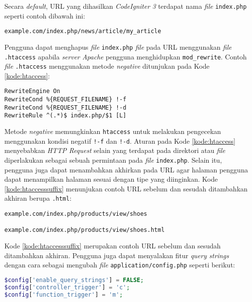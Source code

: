 Secara \textit{default}, URL yang dihasilkan \textit{CodeIgniter 3} terdapat nama \textit{file} \verb|index.php| seperti contoh dibawah ini:

\begin{center}
\verb|example.com/index.php/news/article/my_article|
\end{center}

Pengguna dapat menghapus \textit{file} \verb|index.php| \textit{file} pada URL menggunakan \textit{file} \verb|.htaccess| apabila \textit{server Apache} pengguna menghidupkan \verb|mod_rewrite|. Contoh \textit{file} \verb|.htaccess| menggunakan metode \textit{negative} ditunjukan pada Kode \ref{kode:htaccess}:

\begin{lstlisting}[caption=Contoh \textit{file} \texttt{.htaccess} pada halaman index.php, label=kode:htaccess]
RewriteEngine On
RewriteCond %{REQUEST_FILENAME} !-f
RewriteCond %{REQUEST_FILENAME} !-d
RewriteRule ^(.*)$ index.php/$1 [L]
\end{lstlisting}

Metode \textit{negative} memungkinkan \texttt{htaccess} untuk melakukan pengecekan menggunakan kondisi negatif \verb|!-f| dan \verb|!-d|. Aturan pada Kode \ref{kode:htaccess} menyebabkan \textit{HTTP Request} selain yang terdapat pada direktori atau \textit{file} diperlakukan sebagai sebuah permintaan pada \textit{file} \verb|index.php|. Selain itu, pengguna juga dapat menambahkan akhirkan pada URL agar halaman pengguna dapat menampilkan halaman sesuai dengan tipe yang diinginkan. Kode \ref{kode:htaccesssuffix} menunjukan contoh URL sebelum dan sesudah ditambahkan akhiran berupa \texttt{.html}: 

\begin{lstlisting}[caption=Contoh URL sebelum dan sesudah ditambahkan akhiran, label=kode:htaccesssuffix]
example.com/index.php/products/view/shoes

example.com/index.php/products/view/shoes.html
\end{lstlisting}

Kode \ref{kode:htaccesssuffix} merupakan contoh URL sebelum dan sesudah ditambahkan akhiran. Pengguna juga dapat menyalakan fitur \textit{query strings} dengan cara sebagai mengubah \textit{file} \texttt{application/config.php} seperti berikut:

\begin{lstlisting}[language=PHP, caption=\textit{File application/config.php}, label=kode:querystring]
$config['enable_query_strings'] = FALSE;
$config['controller_trigger'] = 'c';
$config['function_trigger'] = 'm';
\end{lstlisting}

